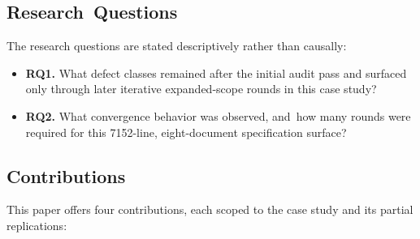 \documentclass[software,article,accept,pdftex,oneauthor]{Definitions/mdpi}
\def\hl#1{#1}
\begin{document}
\subsection{Research~Questions}

The research questions are stated descriptively rather than causally:

\begin{itemize}
\item \textbf{\hl{RQ1.}} What defect classes remained after the initial audit pass and surfaced only through later iterative expanded-scope rounds in this case study?
\item \textbf{\hl{RQ2.}} What convergence behavior was observed, and~how many rounds were required for this 7152-line, eight-document specification surface?
\end{itemize}

\subsection{Contributions}

This paper offers four contributions, each scoped to the case study and its \linebreak  partial replications:
\end{document}
